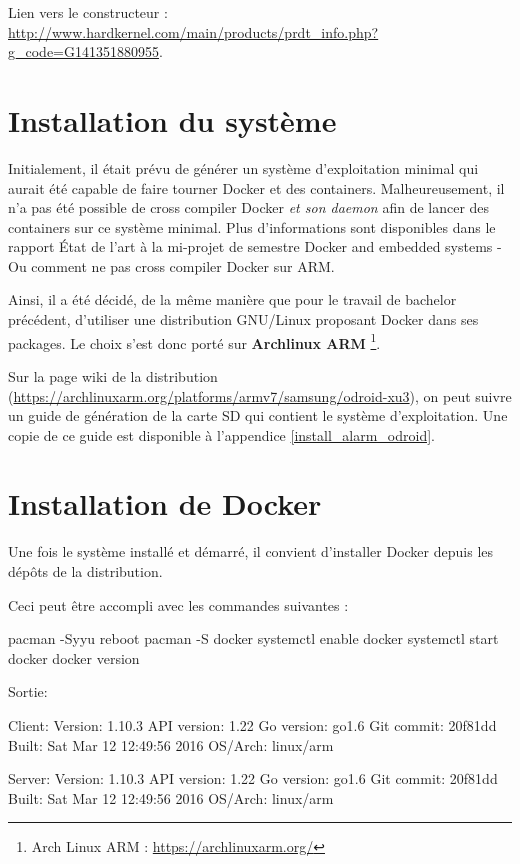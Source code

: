 \documentclass[11pt,a4paper,oneside]{report}
\newcommand{\oldreportname}{État de l’art à la mi-projet de semestre Docker and embedded systems - Ou comment ne pas cross compiler Docker sur ARM}
\begin{document}
Lien vers le constructeur : \url{http://www.hardkernel.com/main/products/prdt_info.php?g_code=G141351880955}.

\section{Installation du système}

Initialement, il était prévu de générer un système d'exploitation minimal qui aurait été capable de faire tourner Docker et des containers. Malheureusement, il n'a pas été possible de cross compiler Docker \textit{et son daemon} afin de lancer des containers sur ce système minimal. Plus d'informations sont disponibles dans le rapport \oldreportname. 

Ainsi, il a été décidé, de la même manière que pour le travail de bachelor précédent, d'utiliser une distribution GNU/Linux proposant Docker dans ses packages. Le choix s'est donc porté sur \textbf{Archlinux ARM} \footnote{Arch Linux ARM : \url{https://archlinuxarm.org/}}.

Sur la page wiki de la distribution (\url{https://archlinuxarm.org/platforms/armv7/samsung/odroid-xu3}), on peut suivre un guide de génération de la carte SD qui contient le système d'exploitation. Une copie de ce guide est disponible à l'appendice \ref{install_alarm_odroid}.


\section{Installation de Docker}
Une fois le système installé et démarré, il convient d'installer Docker depuis les dépôts de la distribution.

Ceci peut être accompli avec les commandes suivantes :

\begin{bashcode}
pacman -Syyu
reboot
pacman -S docker
systemctl enable docker
systemctl start docker
docker version
\end{bashcode}

Sortie:

\begin{bashcode}
Client:
 Version:      1.10.3
 API version:  1.22
 Go version:   go1.6
 Git commit:   20f81dd
 Built:        Sat Mar 12 12:49:56 2016
 OS/Arch:      linux/arm

Server:
 Version:      1.10.3
 API version:  1.22
 Go version:   go1.6
 Git commit:   20f81dd
 Built:        Sat Mar 12 12:49:56 2016
 OS/Arch:      linux/arm
 \end{bashcode}
\end{document}
